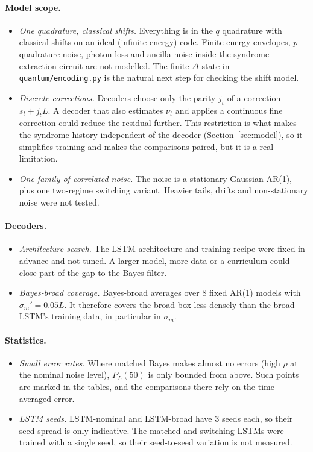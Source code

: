 \paragraph{Model scope.}
\begin{itemize}
  \item \emph{One quadrature, classical shifts.} Everything is in the $q$
    quadrature with classical shifts on an ideal (infinite-energy) code.
    Finite-energy envelopes, $p$-quadrature noise, photon loss and ancilla
    noise inside the syndrome-extraction circuit are not modelled. The
    finite-$\Delta$ state in \texttt{quantum/encoding.py} is the natural next
    step for checking the shift model.
  \item \emph{Discrete corrections.} Decoders choose only the parity $j_t$ of
    a correction $s_t+j_tL$. A decoder that also estimates $\nu_t$ and applies
    a continuous fine correction could reduce the residual further. This
    restriction is what makes the syndrome history independent of the
    decoder (Section~\ref{sec:model}), so it simplifies training and makes
    the comparisons paired, but it is a real limitation.
  \item \emph{One family of correlated noise.} The noise is a stationary
    Gaussian AR(1), plus one two-regime switching variant. Heavier tails,
    drifts and non-stationary noise were not tested.
\end{itemize}

\paragraph{Decoders.}
\begin{itemize}
  \item \emph{Architecture search.} The LSTM architecture and training recipe
    were fixed in advance and not tuned. A larger model, more data or a
    curriculum could close part of the gap to the Bayes filter.
  \item \emph{Bayes-broad coverage.} Bayes-broad averages over 8 fixed AR(1)
    models with $\sigma_m'=0.05L$. It therefore covers the broad box less
    densely than the broad LSTM's training data, in particular in $\sigma_m$.
\end{itemize}

\paragraph{Statistics.}
\begin{itemize}
  \item \emph{Small error rates.} Where matched Bayes makes almost no errors
    (high $\rho$ at the nominal noise level), $P_L(50)$ is only bounded from
    above. Such points are marked in the tables, and the comparisons there
    rely on the time-averaged error.
  \item \emph{LSTM seeds.} LSTM-nominal and LSTM-broad have 3 seeds each, so
    their seed spread is only indicative. The matched and switching LSTMs
    were trained with a single seed, so their seed-to-seed variation is not
    measured.
\end{itemize}

